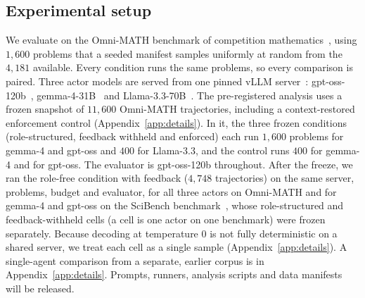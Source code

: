 \subsection{Experimental setup}
\label{sec:experiments}

We evaluate on the Omni-MATH benchmark of competition
mathematics~\cite{gao2025omnimath}, using $1{,}600$ problems that a seeded manifest
samples uniformly at random from the $4{,}181$ available.
Every condition runs the same problems, so every comparison is paired.
Three actor models are served from one pinned vLLM
server~\cite{kwon2023vllm}: gpt-oss-120b~\cite{openai2025gptoss},
gemma-4-31B~\cite{gemma2026gemma4} and
Llama-3.3-70B~\cite{grattafiori2024llama3}. The pre-registered analysis uses a frozen snapshot of $11{,}600$ Omni-MATH trajectories, including a
context-restored enforcement control (Appendix~\ref{app:details}). In it, the three frozen conditions
(role-structured, feedback withheld and enforced) each run $1{,}600$ problems for gemma-4 and gpt-oss and $400$ for Llama-3.3, and the control runs $400$ for
gemma-4 and for gpt-oss. The evaluator is gpt-oss-120b throughout. After the freeze, we ran the role-free condition with feedback
($4{,}748$ trajectories) on the same server, problems, budget and
evaluator, for all three actors on Omni-MATH and for gemma-4 and gpt-oss on
the SciBench benchmark~\cite{wang2024scibench}, whose role-structured and
feedback-withheld cells (a cell is one actor on one benchmark) were frozen separately. Because decoding at
temperature $0$ is not fully deterministic on a shared server, we treat
each cell as a single sample (Appendix~\ref{app:details}). A single-agent comparison from a separate, earlier corpus is in
Appendix~\ref{app:details}. Prompts, runners, analysis scripts and data manifests will be released.
